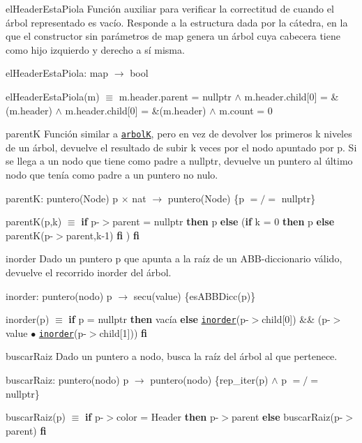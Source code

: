 \begin{DoxyParagraph}{el\-Header\-Esta\-Piola}
Función auxiliar para verificar la correctitud de  cuando el árbol representado es vacío. Responde a la estructura dada por la cátedra, en la que el constructor sin parámetros de map genera un árbol cuya cabecera tiene como hijo izquierdo y derecho a sí misma.

el\-Header\-Esta\-Piola\-: map $\to$ bool \par
el\-Header\-Esta\-Piola(m) $\equiv$ m.\-header.\-parent = nullptr $\land$ m.\-header.\-child\mbox{[}0\mbox{]} = \&(m.\-header) $\land$ m.\-header.\-child\mbox{[}0\mbox{]} = \&(m.\-header) $\land$ m.\-count = 0


\end{DoxyParagraph}
\begin{DoxyParagraph}{parent\-K}
Función similar a \href{axiomas.html#arbolK}{\tt arbol\-K}, pero en vez de devolver los primeros k niveles de un árbol, devuelve el resultado de subir k veces por el nodo apuntado por p. Si se llega a un nodo que tiene como padre a nullptr, devuelve un puntero al último nodo que tenía como padre a un puntero no nulo.

parent\-K\-: puntero(\-Node) p $\times$ nat $\to$ puntero(\-Node) \{p $=/=$ nullptr\} \par
parent\-K(p,k) $\equiv$ {\bfseries if} p-\/$>$parent = nullptr {\bfseries then} p {\bfseries else} ({\bfseries if} k = 0 {\bfseries then} p {\bfseries else} parent\-K(p-\/$>$parent,k-\/1) {\bfseries fi} ) {\bfseries fi} 


\end{DoxyParagraph}
\begin{DoxyParagraph}{inorder}
Dado un puntero p que apunta a la raíz de un A\-B\-B-\/diccionario válido, devuelve el recorrido inorder del árbol.

inorder\-: puntero(nodo) p $\to$ secu(value) \{es\-A\-B\-B\-Dicc(p)\} \par
inorder(p) $\equiv$ {\bfseries if} p = nullptr {\bfseries then} vacía {\bfseries else} \href{axiomas.html#inorder}{\tt inorder}(p-\/$>$child\mbox{[}0\mbox{]}) \&\& (p-\/$>$value $\bullet$ \href{axiomas.html#inorder}{\tt inorder}(p-\/$>$child\mbox{[}1\mbox{]})) {\bfseries fi} 


\end{DoxyParagraph}
\begin{DoxyParagraph}{buscar\-Raiz}
Dado un puntero a nodo, busca la raíz del árbol al que pertenece.

buscar\-Raiz\-: puntero(nodo) p $\to$ puntero(nodo) \{rep\-\_\-iter(p) $\land$ p $=/=$ nullptr\} \par
buscar\-Raiz(p) $\equiv$ {\bfseries if} p-\/$>$color = Header {\bfseries then} p-\/$>$parent {\bfseries else} buscar\-Raiz(p-\/$>$parent) {\bfseries fi} 


\end{DoxyParagraph}
